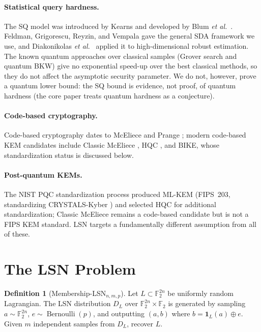 \documentclass[11pt,a4paper]{article}
\theoremstyle{plain}
\theoremstyle{definition}
\newtheorem{definition}[theorem]{Definition}
\newcommand{\F}{\mathbb{F}}
\newcommand{\etal}{\textit{et al.}}
\begin{document}
\paragraph{Statistical query hardness.}
The SQ model was introduced by Kearns \cite{Kea98} and developed by Blum \etal\ \cite{BFJ+94}. Feldman, Grigorescu, Reyzin, and Vempala \cite{FGR+17} gave the general SDA framework we use, and Diakonikolas \etal\ \cite{DKS17} applied it to high-dimensional robust estimation. The known quantum approaches over classical samples (Grover search and quantum BKW) give no exponential speed-up over the best classical methods, so they do not affect the asymptotic security parameter. We do not, however, prove a quantum lower bound: the SQ bound is evidence, not proof, of quantum hardness (the core paper treats quantum hardness as a conjecture).

\paragraph{Code-based cryptography.}
Code-based cryptography dates to McEliece \cite{McE78} and Prange \cite{Pra62}; modern code-based KEM candidates include Classic McEliece \cite{ABD+21}, HQC \cite{AAC+22}, and BIKE, whose standardization status is discussed below.

\paragraph{Post-quantum KEMs.}
The NIST PQC standardization process \cite{NIS22} produced ML-KEM (FIPS~203, standardizing CRYSTALS-Kyber \cite{SAB+22}) and selected HQC \cite{AAC+22} for additional standardization; Classic McEliece \cite{ABD+21} remains a code-based candidate but is not a FIPS KEM standard. LSN targets a fundamentally different assumption from all of these.

\section{The LSN Problem}
\label{sec:lsn-problem}

\begin{definition}[Membership-LSN$_{n,m,p}$]
\label{def:lsn}
Let $L \subset \F_2^{2n}$ be uniformly random Lagrangian. The LSN distribution $D_L$ over $\F_2^{2n} \times \F_2$ is generated by sampling $a \sim \F_2^{2n}$, $e \sim \operatorname{Bernoulli}(p)$, and outputting $(a, b)$ where $b = \mathbf{1}_L(a) \oplus e$. Given $m$ independent samples from $D_L$, recover $L$.
\end{definition}
\end{document}
